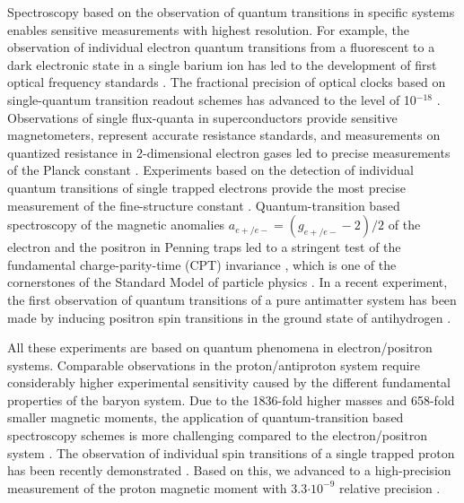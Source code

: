 \documentclass[preprint%
]{elsarticle}
\begin{document}

Spectroscopy based on the observation of quantum transitions in specific systems enables sensitive measurements with highest resolution. For example, the observation of individual electron quantum transitions from a fluorescent to a dark electronic state in a single barium ion \cite{ToschekBaIon,DehmeltBaIon} has led to the development of first optical frequency standards \cite{Bergquist1986}. The fractional precision of optical clocks based on single-quantum transition readout schemes has advanced to the level of 10$^{-18}$ \cite{SingleIonClock}. Observations of single flux-quanta in superconductors provide sensitive magnetometers, represent accurate resistance standards, and measurements on quantized resistance in 2-dimensional electron gases led to precise measurements of the Planck constant \cite{h2011,h2012}. Experiments based on the detection of individual quantum transitions of single trapped electrons provide the most precise measurement of the fine-structure constant \cite{Hanneke2008}. Quantum-transition based spectroscopy of the magnetic anomalies $a_{e+/e-} = (g_{e+/e-}-2)/2$ of the electron and the positron in Penning traps led to a stringent test of the fundamental charge-parity-time (CPT) invariance \cite{Dehmelt,DehmeltCPT}, which is one of the cornerstones of the Standard Model of particle physics \cite{CPT}. In a recent experiment, the first observation of quantum transitions of a pure antimatter system has been made by inducing positron spin transitions in the ground state of antihydrogen \cite{ALPHA2012}.

All these experiments are based on quantum phenomena in electron/positron systems. Comparable observations in the proton/antiproton system require considerably higher experimental sensitivity caused by the different fundamental properties of the baryon system. Due to the 1836-fold higher masses and 658-fold smaller magnetic moments, the application of quantum-transition based spectroscopy schemes is more challenging compared to the electron/positron system \cite{DehmeltCSGE}. The observation of individual spin transitions of a single trapped proton has been recently demonstrated \cite{MooserPRL2013,JackPRL2013}. Based on this, we advanced to a high-precision measurement of the proton magnetic moment with 3.3$\cdot10^{-9}$ relative precision \cite{MooserNature2014}. 
\end{document}
